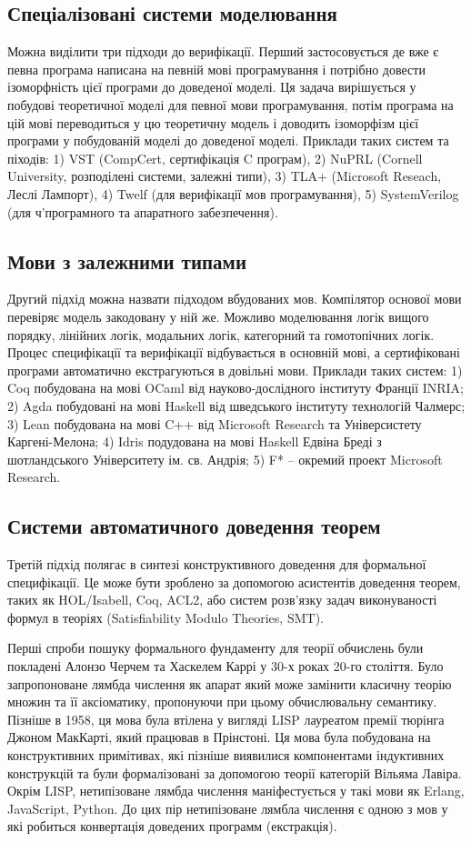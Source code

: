\subsection{Спеціалізовані системи моделювання}
Можна виділити три підходи до верифікації.
Перший застосовується де вже є
певна програма написана на певній мові програмування і потрібно довести ізоморфність
цієї програми до доведеної моделі. Ця задача вирішується у побудові теоретичної моделі
для певної мови програмування, потім програма на цій мові переводиться у цю
теоретичну модель і доводить ізоморфізм цієї програми у побудованій моделі до доведеної моделі.
Приклади таких систем та піходів: 1) VST (CompCert, сертифікація C програм),
2) NuPRL (Cornell University, розподілені системи, залежні типи),
3) TLA+ (Microsoft Reseach, Леслі Лампорт),
4) Twelf (для верифікації мов програмування), 5) SystemVerilog (для
ч'програмного та апаратного забезпечення).

\subsection{Мови з залежними типами}
Другий підхід можна назвати підходом вбудованих мов.
Компілятор основої мови перевіряє модель закодовану у ній же. Можливо моделювання
логік вищого порядку, лінійних логік, модальних логік, категорний та гомотопічних логік.
Процес специфікації та верифікації відбувається в основній мові, а сертифіковані програми
автоматично екстрагуються в довільні мови.
Приклади таких систем: 1) Coq побудована на мові OCaml від науково-дослідного
інституту Франції INRIA; 2) Agda побудовані на мові Haskell від шведського інституту технологій Чалмерс;
3) Lean побудована на мові C++ від Microsoft Research та Універсистету Каргені-Мелона;
4) Idris подудована на мові Haskell Едвіна Бреді з шотландського Університету ім. св. Андрія;
5) F* -- окремий проект Microsoft Research.

\subsection{Системи автоматичного доведення теорем}
Третій підхід полягає в синтезі конструктивного доведення
для формальної специфікації. Це може бути зроблено за
допомогою асистентів доведення теорем, таких як HOL/Isabell, Coq, ACL2,
або систем розв'язку задач виконуваності формул в теоріях (Satisfiability Modulo Theories, SMT).

Перші спроби пошуку формального фундаменту для теорії обчислень були покладені
Алонзо Черчем та Хаскелем Каррі у 30-х роках 20-го століття. Було запропоноване
лямбда числення як апарат який може замінити класичну теорію множин та її аксіоматику,
пропонуючи при цьому обчислювальну семантику. Пізніше в 1958, ця мова була втілена
у вигляді LISP лауреатом премії тюрінга Джоном МакКарті, який працював в Прінстоні.
Ця мова була побудована на конструктивних примітивах, які пізніше виявилися компонентами
індуктивних конструкцій та були формалізовані за допомогою
теорії категорій Вільяма Лавіра. Окрім LISP, нетипізоване лямбда числення
маніфестується у такі мови як Erlang, JavaScript, Python.
До цих пір нетипізоване лямбла числення є одною з мов у які робиться
конвертація доведених программ (екстракція).


